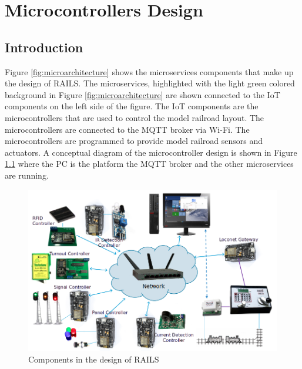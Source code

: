 \chapter{Microcontrollers Design}
\label{chap:microcontrollers-design}
\section{Introduction}
\label{sec:introduction}
Figure \ref{fig:microarchitecture} shows the microservices components that make up the design of \ac{RAILS}. The microservices,
highlighted with the light green colored background in Figure \ref{fig:microarchitecture} are shown connected to the \ac{IoT} components on the left side of the figure.
The \ac{IoT} components are the microcontrollers that are used to control the model railroad layout. The microcontrollers are connected to the \ac{MQTT} broker via Wi-Fi. 
The microcontrollers are programmed to provide model railroad sensors and actuators. A conceptual diagram of the microcontroller design is shown in Figure 
\ref{fig:system-concept} where the PC is the platform the \ac{MQTT} broker and the other microservices are running.
\begin{figure}[htbp]
    \centering
    \includegraphics[scale=0.5]{system-concept.png}
    \caption{Components in the design of RAILS}
    \label{fig:system-concept}
\end{figure}

